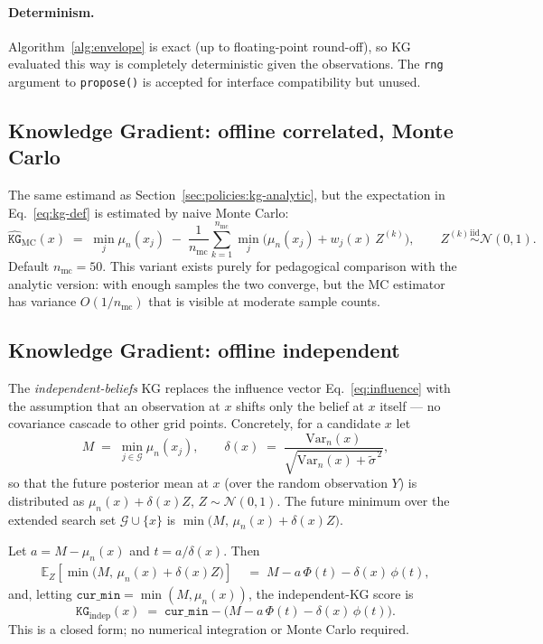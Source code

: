 \documentclass[11pt]{article}
\newcommand{\Normal}{\mathcal{N}}
\newcommand{\Ex}{\mathbb{E}}
\newcommand{\Var}{\mathrm{Var}}
\newcommand{\muN}{\mu_n}
\newcommand{\sigTilde}{\tilde{\sigma}}
\newcommand{\code}[1]{\texttt{#1}}
\begin{document}
\paragraph{Determinism.} Algorithm~\ref{alg:envelope} is exact
(up to floating-point round-off), so KG evaluated this way is completely
deterministic given the observations. The \code{rng} argument to
\code{propose()} is accepted for interface compatibility but unused.

\subsection{Knowledge Gradient: offline correlated, Monte Carlo}
\label{sec:policies:kg-mc}

The same estimand as Section~\ref{sec:policies:kg-analytic}, but the
expectation in Eq.~\eqref{eq:kg-def} is estimated by naive Monte Carlo:
\[
  \widehat{\code{KG}}_{\mathrm{MC}}(x) \;=\; \min_j \muN(x_j) \;-\; \frac{1}{n_{\mathrm{mc}}} \sum_{k=1}^{n_{\mathrm{mc}}} \min_j \bigl(\muN(x_j) + w_j(x)\, Z^{(k)}\bigr),
  \qquad Z^{(k)} \stackrel{\text{iid}}{\sim} \Normal(0,1).
\]
Default $n_{\mathrm{mc}} = 50$. This variant exists purely for pedagogical
comparison with the analytic version: with enough samples the two
converge, but the MC estimator has variance $O(1/n_{\mathrm{mc}})$ that is
visible at moderate sample counts.

\subsection{Knowledge Gradient: offline independent}
\label{sec:policies:kg-indep}

The \emph{independent-beliefs} KG replaces the influence vector
Eq.~\eqref{eq:influence} with the assumption that an observation at $x$
shifts only the belief at $x$ itself — no covariance cascade to other grid
points. Concretely, for a candidate $x$ let
\[
  M \;=\; \min_{j \in \mathcal{G}} \muN(x_j),
  \qquad
  \delta(x) \;=\; \frac{\Var_n(x)}{\sqrt{\Var_n(x) + \sigTilde^{\,2}}},
\]
so that the future posterior mean at $x$ (over the random observation
$Y$) is distributed as $\muN(x) + \delta(x) Z$, $Z \sim \Normal(0,1)$.
The future minimum over the extended search set $\mathcal{G} \cup \{x\}$
is $\min\!\bigl(M,\, \muN(x) + \delta(x) Z\bigr)$.

Let $a = M - \muN(x)$ and $t = a / \delta(x)$. Then
\begin{align*}
  \Ex_Z\!\left[\min\!\bigl(M,\, \muN(x) + \delta(x) Z\bigr)\right]
  &\;=\; M - a\,\Phi(t) - \delta(x)\,\phi(t),
\end{align*}
and, letting $\code{cur\_min} = \min(M, \muN(x))$, the independent-KG
score is
\begin{equation}
  \code{KG}_{\mathrm{indep}}(x) \;=\; \code{cur\_min} - \bigl(M - a\,\Phi(t) - \delta(x)\,\phi(t)\bigr).
  \label{eq:kg-indep}
\end{equation}
This is a closed form; no numerical integration or Monte Carlo required.
\end{document}
